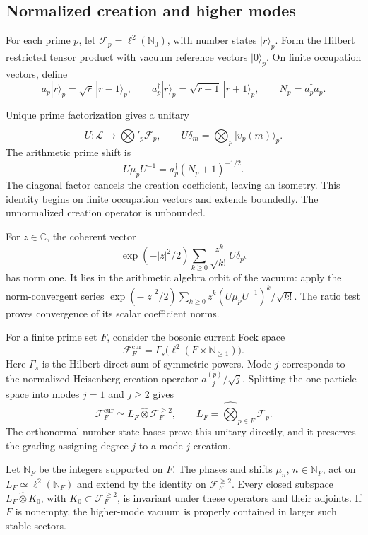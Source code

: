 \subsection{Normalized creation and higher modes}

For each prime $p$, let $\mathscr F_p=\ell^2(\mathbb N_0)$, with number
states $|r\rangle_p$. Form the Hilbert restricted tensor product with vacuum
reference vectors $|0\rangle_p$. On finite occupation vectors, define
\[
 a_p|r\rangle_p=\sqrt r\,|r-1\rangle_p,\qquad
 a_p^\dagger|r\rangle_p=\sqrt{r+1}\,|r+1\rangle_p,\qquad
 N_p=a_p^\dagger a_p.
\]

Unique prime factorization gives a unitary
\[
 U:\mathcal L\longrightarrow
       \widehat{\bigotimes}'_p\mathscr F_p,\qquad
 U\delta_m=\bigotimes_p|v_p(m)\rangle_p.
\]
The arithmetic prime shift is
\[
 U\mu_pU^{-1}=a_p^\dagger(N_p+1)^{-1/2}.
\]
The diagonal factor cancels the creation coefficient, leaving an isometry.
This identity begins on finite occupation vectors and extends boundedly. The
unnormalized creation operator is unbounded.

For $z\in\mathbb C$, the coherent vector
\[
 \exp(-|z|^2/2)\sum_{k\geq0}
     \frac{z^k}{\sqrt{k!}}U\delta_{p^k}
\]
has norm one. It lies in the arithmetic algebra orbit of the vacuum: apply
the norm-convergent series
$\exp(-|z|^2/2)\sum_{k\geq0}z^k(U\mu_pU^{-1})^k/\sqrt{k!}$. The ratio test
proves convergence of its scalar coefficient norms.

For a finite prime set $F$, consider the bosonic current Fock space
\[
 \mathscr F_F^{\mathrm{cur}}
   =\Gamma_s\bigl(\ell^2(F\times\mathbb N_{\geq1})\bigr).
\]
Here $\Gamma_s$ is the Hilbert direct sum of symmetric powers. Mode $j$
corresponds to the normalized Heisenberg creation operator
$a_{-j}^{(p)}/\sqrt j$. Splitting the one-particle space into modes $j=1$
and $j\geq2$ gives
\[
 \mathscr F_F^{\mathrm{cur}}
  \simeq L_F\widehat\otimes\mathscr F_F^{\geq2},
 \qquad
 L_F=\widehat\bigotimes_{p\in F}\mathscr F_p.
\]
The orthonormal number-state bases prove this unitary directly, and it
preserves the grading assigning degree $j$ to a mode-$j$ creation.

Let $\mathbb N_F$ be the integers supported on $F$. The phases and shifts
$\mu_n$, $n\in\mathbb N_F$, act on $L_F\simeq\ell^2(\mathbb N_F)$ and extend
by the identity on $\mathscr F_F^{\geq2}$. Every closed subspace
$L_F\widehat\otimes K_0$, with $K_0\subset\mathscr F_F^{\geq2}$, is
invariant under these operators and their adjoints. If $F$ is nonempty, the
higher-mode vacuum is properly contained in larger such stable sectors.

